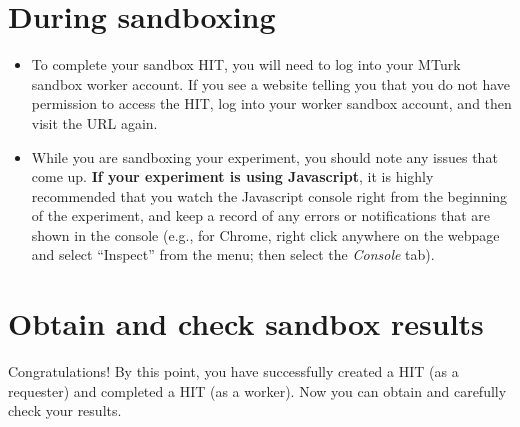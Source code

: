 \documentclass{article}
\begin{document}
\section{During sandboxing}

\begin{itemize}
  \item To complete your sandbox HIT, you will need to log into your MTurk sandbox worker account. If you see a website telling you that you do not have permission to access the HIT, log into your worker sandbox account, and then visit the URL again.
  \item While you are sandboxing your experiment, you should note any issues that come up. \textbf{If your experiment is using Javascript}, it is highly recommended that you watch the Javascript console right from the beginning of the experiment, and keep a record of any errors or notifications that are shown in the console (e.g., for Chrome, right click anywhere on the webpage and select ``Inspect'' from the menu; then select the {\it Console} tab).

\end{itemize}


\section{Obtain and check sandbox results}\label{sec:obtain-sandbox-results}

Congratulations! By this point, you have successfully created a HIT (as a requester) and completed a HIT (as a worker). Now you can obtain and carefully check your results.
\end{document}
